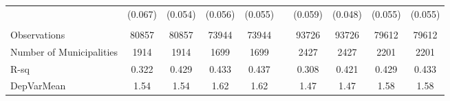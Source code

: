\begin{tabular}{lccccccccc}
      & (0.067) & (0.054) & (0.056) & (0.055) &       & (0.059) & (0.048) & (0.055) & (0.055) \\
      &       &       &       &       &       &       &       &       &  \\
\midrule
Observations & 80857 & 80857 & 73944 & 73944 &       & 93726 & 93726 & 79612 & 79612 \\
Number of Municipalities & 1914  & 1914  & 1699  & 1699  &       & 2427  & 2427  & 2201  & 2201 \\
R-sq  & 0.322 & 0.429 & 0.433 & 0.437 &       & 0.308 & 0.421 & 0.429 & 0.433 \\
DepVarMean & 1.54  & 1.54  & 1.62  & 1.62  &       & 1.47  & 1.47  & 1.58  & 1.58 \\
\bottomrule
\bottomrule
\end{tabular}%
